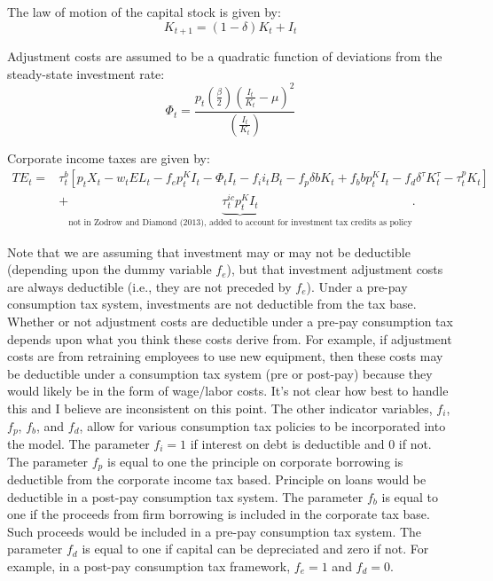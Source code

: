 The law of motion of the capital stock is given by:
\begin{equation}
\label{eqn:lom_capital}
K_{t+1}=(1-\delta)K_{t} + I_{t}
\end{equation}

Adjustment costs are assumed to be a quadratic function of deviations from the steady-state investment rate:
\begin{equation}
\label{eqn:adj_cost}
\Phi_{t}=\frac{p_{t}\left(\frac{\beta}{2}\right)\left(\frac{I_{t}}{K_{t}}-\mu\right)^{2}}{\left(\frac{I_{t}}{K_{t}}\right)}
\end{equation}

Corporate income taxes are given by:
\begin{equation}
\label{eqn:corp_tax}
\begin{split}
TE_{t}= & \tau^{b}_{t}\left[p_{t}X_{t}-w_{t}EL_{t}-f_{e}p^{K}_{t}I_{t}-\Phi_{t}I_{t}-f_{i}i_{t}B_{t}-f_{p}\delta b K_{t}+f_{b}bp^{K}_{t}I_{t}-f_{d}\delta^{\tau}K^{\tau}_{t}-\tau^{p}_{t}K_{t}\right] \\
& +\underbrace{\tau^{ic}_{t}p^{K}_{t}I_{t}}_{\text{not in Zodrow and Diamond (2013), added to account for investment tax credits as policy}}.
\end{split}
\end{equation}

\noindent\noindent  Note that we are assuming that investment may or may not be deductible (depending upon the dummy variable $f_{e}$), but that investment adjustment costs are always deductible (i.e., they are not preceded by $f_{e}$).  Under a pre-pay consumption tax system, investments are not deductible from the tax base.  Whether or not adjustment costs are deductible under a pre-pay consumption tax depends upon what you think these costs derive from.  For example, if adjustment costs are from retraining employees to use new equipment, then these costs may be deductible under a consumption tax system (pre or post-pay) because they would likely be in the form of wage/labor costs. It's not clear how best to handle this and I believe \citet{DZ2013} are inconsistent on this point.  The other indicator variables, $f_{i}$, $f_{p}$, $f_{b}$, and $f_{d}$, allow for various consumption tax policies to be incorporated into the model.  The parameter $f_{i}=1$ if interest on debt is deductible and 0 if not.  The parameter $f_{p}$ is equal to one the principle on corporate borrowing is deductible from the corporate income tax based.  Principle on loans would be deductible in a post-pay consumption tax system.  The parameter $f_{b}$ is equal to one if the proceeds from firm borrowing is included in the corporate tax base.  Such proceeds would be included in a pre-pay consumption tax system.  The parameter $f_{d}$ is equal to one if capital can be depreciated and zero if not.  For example, in a post-pay consumption tax framework, $f_{e}=1$ and $f_{d}=0$.  

